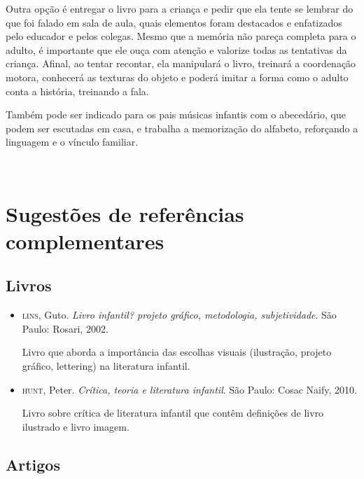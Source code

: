 \documentclass[11pt]{extarticle}
\begin{document}
\begin{enumerate}
Outra opção é entregar o livro para a criança e pedir que ela tente se lembrar
do que foi falado em sala de aula, quais elementos foram destacados e enfatizados pelo educador e pelos colegas. Mesmo que a memória não pareça 
completa para o adulto, é importante que ele ouça com atenção e 
valorize todas as tentativas da criança. Afinal, ao tentar recontar, 
ela manipulará o livro, treinará a coordenação motora, conhecerá as texturas 
do objeto e poderá imitar a forma como o adulto 
conta a história, treinando a fala. 

Também pode ser indicado para os pais músicas infantis com o abecedário, que podem ser escutadas em casa, e trabalha a memorização do alfabeto, reforçando a linguagem e o vínculo familiar. 
\end{enumerate}

 
\section{Sugestões de referências complementares}

\subsection{Livros} 

\begin{itemize}
\item \textsc{lins}, Guto. \textit{Livro infantil? projeto gráfico, metodologia, subjetividade}. São Paulo: Rosari, 2002.

Livro que aborda a importância das escolhas visuais (ilustração, projeto gráfico, lettering) na literatura infantil.  

\item \textsc{hunt}, Peter. \textit{Crítica, teoria e literatura infantil}. São Paulo: Cosac Naify, 2010.

Livro sobre crítica de literatura infantil que contêm definições de livro ilustrado e livro imagem. 
\end{itemize}

\subsection{Artigos}
\end{document}

